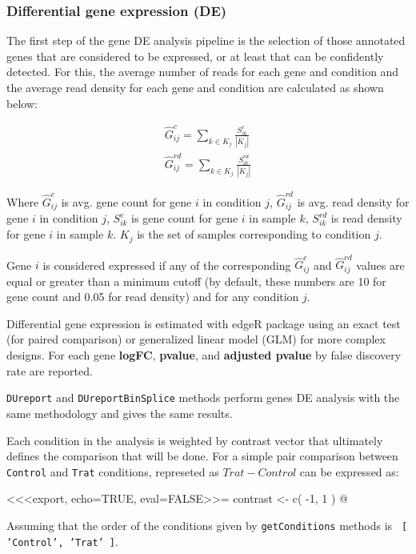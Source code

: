 \documentclass{article}
\begin{document}
\subsubsection{Differential gene expression (DE)}
\label{sec:de}

The first step of the gene DE analysis pipeline is the selection of those
annotated genes that are considered to be expressed, or at least that can be
confidently detected. For this, the average number of reads for each gene
and condition and the average read density for each gene and condition are
calculated as shown below:

\begin{eqnarray*}
   \hat G^{c}_{ij} = \sum_{k \in K_j} \frac{ S^{c}_{ik} }{ |K_j| } \\
   \hat G^{rd}_{ij} = \sum_{k \in K_j} \frac{ S^{rd}_{ik} }{ |K_j| }
   \label{eq:genByCond}
\end{eqnarray*}

Where $\hat G^{c}_{ij}$ is avg. gene count for gene $i$ in condition $j$,
$\hat G^{rd}_{ij}$ is avg. read density for gene $i$ in condition $j$, $S^{c}_{ik}$
is gene count for gene $i$ in sample $k$, $S^{rd}_{ik}$ is read density for
gene $i$ in sample $k$. $K_j$ is the set of samples corresponding to condition $j$.

Gene $i$ is considered expressed if any of the corresponding $\hat G^{c}_{ij}$
and $\hat G^{rd}_{ij}$ values are equal or greater than a minimum cutoff (by 
default, these numbers are 10 for gene count and 0.05 for read density) and for
any condition $j$.

Differential gene expression is estimated with edgeR \cite{Robinson2012} 
package using an exact test (for paired comparison) or generalized linear model
(GLM) for more complex designs. For each gene \textbf{logFC}, \textbf{pvalue},
and \textbf{adjusted  pvalue} by false discovery rate \cite{fdr} are reported. 

\texttt{DUreport} and \texttt{DUreportBinSplice} methods perform genes DE
analysis with the same methodology and gives the same results. 

Each condition in the analysis is weighted by contrast vector that ultimately
defines the comparison that will be done. For a simple pair comparison between
\texttt{Control} and \texttt{Trat} conditions, represeted as $Trat - Control$ 
can be expressed as:

<<<export, echo=TRUE, eval=FALSE>>=
contrast <- c( -1, 1 ) 
@

Assuming that the order of the conditions given by \texttt{getConditions}
methods is \texttt{ [ 'Control', 'Trat' ]}. 
\end{document}
